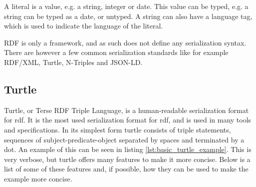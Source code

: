 A literal is a value, e.g. a string, integer or date. This value can be typed, e.g. a string can be typed as a date, or untyped. A string can also have a language tag, which is used to indicate the language of the literal.

RDF is only a framework, and as such does not define any serialization syntax. There are however a few common serialization standards like for example RDF/XML, Turtle, N-Triples and JSON-LD. 

\subsection{Turtle}
Turtle, or Terse RDF Triple Language, is a human-readable serialization format for \acrshort{rdf}. It is the most used serialization format for \acrshort{rdf}, and is used in many tools and specifications. 
In its simplest form turtle consists of triple statements, sequences of subject-predicate-object separated by spaces and terminated by a dot. An example of this can be seen in listing \ref{lst:basic_turtle_example}. This is very verbose, but turtle offers many features to make it more concise. Below is a list of some of these features and, if possible, how they can be used to make the example more concise.
